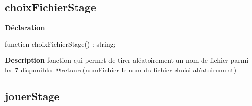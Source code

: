 \documentclass{report}
\newif\ifpdf
\begin{document}
\subsection*{choixFichierStage}
\fi
\label{Stage-choixFichierStage}
\begin{list}{}{
\setlength{\itemindent}{0cm}
\setlength{\listparindent}{0cm}
\setlength{\leftmargin}{\evensidemargin}
\addtolength{\leftmargin}{\tmplength}
\settowidth{\labelsep}{X}
\addtolength{\leftmargin}{\labelsep}
\setlength{\labelwidth}{\tmplength}
}
\item[\textbf{Déclaration}\hfill]
\ifpdf
\begin{flushleft}
\fi
\begin{ttfamily}
function choixFichierStage() : string;\end{ttfamily}

\ifpdf
\end{flushleft}
\fi

\par
\item[\textbf{Description}]
fonction qui permet de tirer aléatoirement un nom de fichier parmi les 7 disponibles @retunrs(nomFichier le nom du fichier choisi aléatoirement)

\end{list}
\ifpdf
\subsection*{\large{\textbf{jouerStage}}\normalsize\hspace{1ex}\hrulefill}
\else
\end{document}
